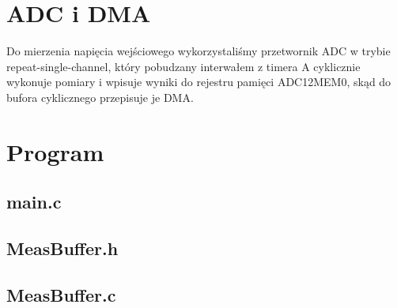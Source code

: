 \documentclass[fleqn]{article}
\begin{document}
\section{ADC i DMA}
Do mierzenia napięcia wejściowego wykorzystaliśmy przetwornik ADC w trybie repeat-single-channel, który pobudzany interwałem z timera A cyklicznie wykonuje pomiary i wpisuje wyniki do rejestru pamięci ADC12MEM0, skąd do bufora cyklicznego przepisuje je DMA.



\section{Program}
\subsection{main.c}

\begin{minipage}[t]{.49\textwidth}
	
\end{minipage}\hfill
\noindent\begin{minipage}[t]{.49\textwidth}
	
\end{minipage}\hfill

\begin{minipage}[t]{.49\textwidth}
	
\end{minipage}\hfill
\noindent\begin{minipage}[t]{.49\textwidth}
	\subsection{MeasBuffer.h}
	
	\subsection{MeasBuffer.c}
	
\end{minipage}\hfill
\end{document}
